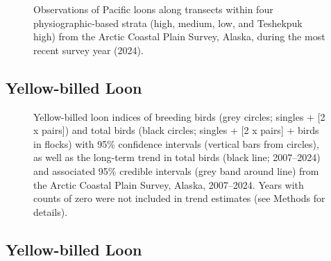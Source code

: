 \documentclass[
]{article}
\begin{document}
\begin{figure}


\caption{\label{fig-PALOmap}Observations of Pacific loons along
transects within four physiographic-based strata (high, medium, low, and
Teshekpuk high) from the Arctic Coastal Plain Survey, Alaska, during the
most recent survey year (2024).}

\end{figure}%

\newpage{}

\subsection*{Yellow-billed Loon}\label{yellow-billed-loon}

\begin{figure}


\caption{\label{fig-YBLO}Yellow-billed loon indices of breeding birds
(grey circles; singles + {[}2 x pairs{]}) and total birds (black
circles; singles + {[}2 x pairs{]} + birds in flocks) with 95\%
confidence intervals (vertical bars from circles), as well as the
long-term trend in total birds (black line; 2007--2024) and associated
95\% credible intervals (grey band around line) from the Arctic Coastal
Plain Survey, Alaska, 2007--2024. Years with counts of zero were not
included in trend estimates (see Methods for details).}

\end{figure}%

\newpage{}

\subsection*{Yellow-billed Loon}\label{yellow-billed-loon-1}

\begingroup\fontsize{10}{12}\selectfont
\end{document}

